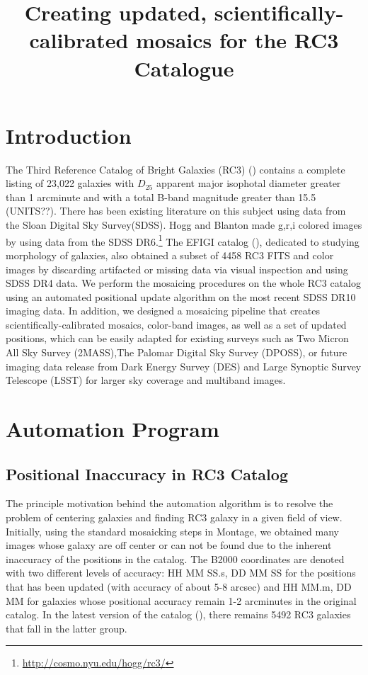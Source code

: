 \documentclass[5p]{elsarticle}
\begin{document}
\title{Creating updated, scientifically-calibrated mosaics for the RC3 Catalogue}
\maketitle 

\section{Introduction}
The Third Reference Catalog of Bright Galaxies (RC3) (\citet{rc3}) contains a  complete listing of 23,022 galaxies with $D_25$ apparent major isophotal diameter  greater than 1 arcminute and with a total B-band magnitude greater than 15.5 (UNITS??). There has been existing literature on this subject using data from the Sloan Digital Sky Survey(SDSS). Hogg and Blanton made g,r,i colored images by using data from the SDSS DR6.\footnote{\url{http://cosmo.nyu.edu/hogg/rc3/}} The EFIGI catalog (\citet{efigi}), dedicated to studying morphology of galaxies, also  obtained a subset of 4458 RC3 FITS and color images by discarding artifacted or missing data via visual inspection and using SDSS DR4 data. We perform the mosaicing procedures on the whole RC3 catalog using  an automated positional update algorithm  on the most recent SDSS DR10 imaging data. In addition, we designed a mosaicing pipeline that creates scientifically-calibrated mosaics, color-band images, as well as a set of updated positions, which can be easily adapted for existing surveys such as Two Micron All Sky Survey  (2MASS),The Palomar Digital Sky Survey (DPOSS), or future imaging data release from  Dark Energy Survey (DES) and Large Synoptic Survey Telescope (LSST) for larger sky coverage and multiband images.
\section{Automation Program}

	\subsection{Positional Inaccuracy in RC3 Catalog}
	The principle motivation behind the automation algorithm is to resolve the problem of centering galaxies and finding RC3 galaxy in a given field of view. Initially, using the standard mosaicking steps in Montage, we obtained many images whose galaxy are off center or can not be found due to the inherent inaccuracy of the positions in the catalog. 
The B2000 coordinates are denoted with two different levels of accuracy: HH MM SS.s, DD MM SS for the positions that has been updated  (with accuracy of about 5-8 arcsec) and  HH MM.m, DD MM for galaxies whose positional accuracy remain  1-2 arcminutes in the original catalog.  In the latest version of the catalog (\citet{rc31991}), there remains 5492 RC3 galaxies that fall in the latter group.
\end{document}
